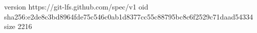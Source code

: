 version https://git-lfs.github.com/spec/v1
oid sha256:e2de8c3bd8964fde75c546c0ab1d8377cc55c88795bc8c6f2529c71daad54334
size 2216
